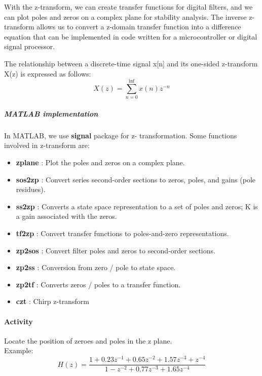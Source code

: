 \documentclass[12pt]{article}
\begin{document}
With the z-transform, we can create transfer functions for digital filters, 
and we can plot poles and zeros on a complex plane for stability analysis. 
The inverse z-transform allows us to convert a z-domain transfer function into a difference equation 
that can be implemented in code written for a microcontroller or digital signal processor.

The relationship between a discrete-time signal x[n] and its one-sided z-transform X(z) is expressed as follows:
\begin{equation}
        X(z) = \sum_{n=0}^{\inf} x(n)z^{-n}
\end{equation}
\subparagraph{MATLAB implementation\\}
In MATLAB, we use {\bfseries signal} package for z- transformation. 
Some functions involved in z-transform are: 
\begin{itemize}
    \item {\bfseries zplane} : Plot the poles and zeros on a complex plane.
    \item {\bfseries sos2zp} : Convert series second-order sections to zeros, poles, and gains (pole residues).
    \item {\bfseries ss2zp} : Converts a state space representation to a set of poles and zeros; K is a gain associated with the zeros.
    \item {\bfseries tf2zp} : Convert transfer functions to poles-and-zero representations.
    \item {\bfseries zp2sos} : Convert filter poles and zeros to second-order sections.
    \item {\bfseries zp2ss} : Conversion from zero / pole to state space.
    \item {\bfseries zp2tf} : Converts zeros / poles to a transfer function.
    \item {\bfseries czt} : Chirp z-transform
\end{itemize}
\pagebreak
\paragraph{Activity\\}
Locate the position of zeroes and poles in the z plane.\\
Example:
\begin{equation}
    H(z) =  \frac{1 + 0.23 z^{-1} + 0.65 z^{-2} + 1.57 z^{-3} + z^{-4} }{ 1 - z^{-2} +0.77 z^{-3} + 1.65 z^{-4} } \nonumber
\end{equation}
\end{document}
